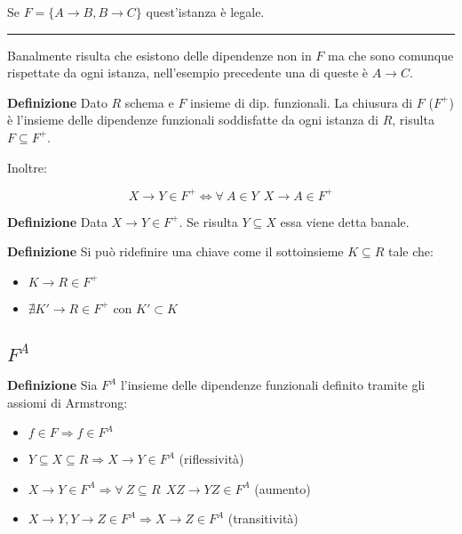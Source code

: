 \documentclass{article}
\begin{document}
\noindent Se $F=\{A\rightarrow B, B\rightarrow C\}$ quest'istanza è legale.

\noindent\rule{\textwidth}{0.5pt}\newline

\noindent Banalmente risulta che esistono delle dipendenze non in $F$ ma che sono comunque rispettate da ogni istanza, nell'esempio precedente una di queste è $A\rightarrow C$.\newline

\noindent\textbf{Definizione} Dato $R$ schema e $F$ insieme di dip. funzionali. La chiusura di $F$ ($F^+$) è l'insieme delle dipendenze funzionali soddisfatte da ogni istanza di $R$, risulta $F\subseteq F^+$.\newline

\noindent Inoltre:

$$X\rightarrow Y\in F^+\iff\forall\ A\in Y \ \ X\rightarrow A\in F^+$$\newline

\noindent\textbf{Definizione} Data $X\rightarrow Y\in F^+$. Se risulta $Y\subseteq X$ essa viene detta banale.\newline

\noindent\textbf{Definizione} Si può ridefinire una chiave come il sottoinsieme $K\subseteq R$ tale che:
\begin{itemize}
    \item $K\rightarrow R\in F^+$
    \item $\nexists K'\rightarrow R\in F^+$ con $K'\subset K$\newline
\end{itemize}

\subsection{$F^A$}

\textbf{Definizione} Sia $F^A$ l'insieme delle dipendenze funzionali definito tramite gli assiomi di Armstrong:
\begin{itemize}
    \item $f\in F\Rightarrow f\in F^A$
    \item $Y\subseteq X\subseteq R\Rightarrow X\rightarrow Y\in F^A$ (riflessività)
    \item $X\rightarrow Y\in F^A\Rightarrow\forall\ Z\subseteq R\ \ XZ\rightarrow YZ\in F^A$ (aumento)
    \item $X\rightarrow Y,Y\rightarrow Z\in F^A\Rightarrow X\rightarrow Z\in F^A$ (transitività)
\end{itemize}
\end{document}
